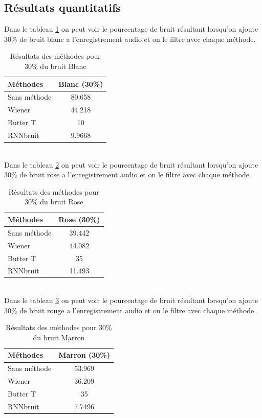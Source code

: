 \documentclass[conference,onecolumn]{IEEEtran}
\begin{document}
\subsection{Résultats quantitatifs}
Dans le tableau \ref{table:t1} on peut voir le pourcentage de bruit résultant lorsqu’on ajoute 30\% de bruit blanc a l’enregistrement audio et on le filtre avec chaque méthode.
\begin{table}[H]
    \centering
    \begin{tabular}{ l  c }
    \textbf{Méthodes} & \textbf{Blanc (30\%)} \\
    \hline
    Sans méthode & 80.658 \\
    Wiener & 44.218 \\
    Butter T & 10 \\
    RNNbruit & 9.9668 \\
    \end{tabular}
    \caption{Résultats des méthodes pour 30\% du bruit Blanc}
    \label{table:t1}
\end{table}
\hfill \\
Dans le tableau \ref{table:t2} on peut voir le pourcentage de bruit résultant lorsqu’on ajoute 30\% de bruit rose a l’enregistrement audio et on le filtre avec chaque méthode.
\begin{table}[H]
    \centering
    \begin{tabular}{ l  c }
    \textbf{Méthodes} & \textbf{Rose (30\%)} \\
    \hline
    Sans méthode & 39.442 \\
    Wiener & 44.082 \\
    Butter T & 35 \\
    RNNbruit & 11.493 \\
    \end{tabular}
    \caption{Résultats des méthodes pour 30\% du bruit Rose}
    \label{table:t2}
\end{table}
\hfill \\
Dans le tableau \ref{table:t3} on peut voir le pourcentage de bruit résultant lorsqu’on ajoute 30\% de bruit rouge a l’enregistrement audio et on le filtre avec chaque méthode.
\begin{table}[H]
    \centering
    \begin{tabular}{ l  c }
    \textbf{Méthodes} & \textbf{Marron (30\%)} \\
    \hline
    Sans méthode & 53.969 \\
    Wiener & 36.209 \\
    Butter T & 35 \\
    RNNbruit & 7.7496 \\
    \end{tabular}
    \caption{Résultats des méthodes pour 30\% du bruit Marron}
    \label{table:t3}
\end{table}
\hfill \\
\end{document}
